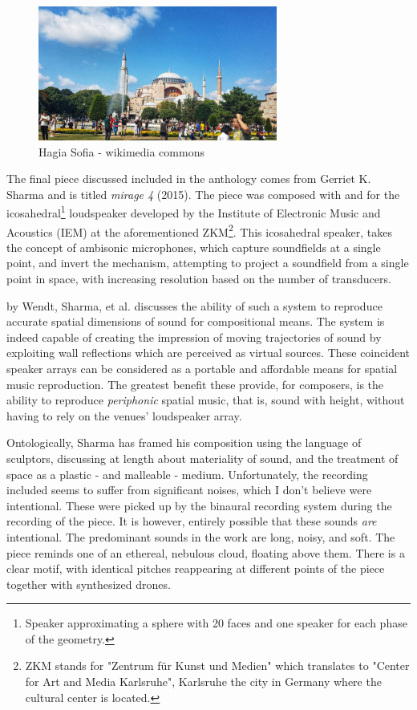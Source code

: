 \begin{figure}[ht!]%
\centering
\includegraphics[width=0.7\textwidth]{img/hagia-sofia.jpg} 
\caption{Hagia Sofia - wikimedia commons}
\end{figure}

The final piece discussed included in the anthology comes from Gerriet K. Sharma and is titled \textit{mirage 4} (2015). The piece was composed with and for the icosahedral\footnote{Speaker approximating a sphere with 20 faces and one speaker for each phase of the geometry.} loudspeaker developed by the Institute of Electronic Music and Acoustics (IEM) at the aforementioned ZKM\footnote{ZKM stands for "Zentrum für Kunst und Medien" which translates to "Center for Art and Media Karlsruhe", Karlsruhe the city in Germany where the cultural center is located.}. This icosahedral speaker, takes the concept of ambisonic microphones, which capture soundfields at a single point, and invert the mechanism, attempting to project a soundfield from a single point in space, with increasing resolution based on the number of transducers. 

\cite{wendt2017perception} by Wendt, Sharma, et al. discusses the ability of such a system to reproduce accurate spatial dimensions of sound for compositional means. The system is indeed capable of creating the impression of moving trajectories of sound by exploiting wall reflections which are perceived as virtual sources. These coincident speaker arrays can be considered as a portable and affordable means for spatial music reproduction. The greatest benefit these provide, for composers, is the ability to reproduce \textit{periphonic} spatial music, that is, sound with height, without having to rely on the venues' loudspeaker array. 

Ontologically, Sharma has framed his composition using the language of sculptors, discussing at length about materiality of sound, and the treatment of space as a plastic - and malleable - medium. Unfortunately, the recording included seems to suffer from significant noises, which I don't believe were intentional. These were picked up by the binaural recording system during the recording of the piece. It is however, entirely possible that these sounds \textit{are} intentional. The predominant sounds in the work are long, noisy, and soft. The piece reminds one of an ethereal, nebulous cloud, floating above them. There is a clear motif, with identical pitches reappearing at different points of the piece together with synthesized drones. 

